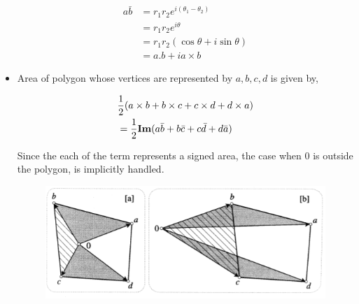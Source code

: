\documentclass[12pt]{article}
\def\mf{\ensuremath\mathbf}
\begin{document}
\begin{itemize}
    \begin{align*}
        a\bar{b} &= r_1r_2 e^{i(\theta_1-\theta_2)}\\
        &= r_1r_2e^{i\theta}\\
        &= r_1r_2(\cos\theta+i\sin\theta)\\
        &= a.b + ia\times b
    \end{align*}
    \item Area of polygon whose vertices are represented by $a,b,c,d$ is given by,

    \begin{align*}
        &\frac{1}{2}(a\times b + b\times c + c\times d + d\times a)\\
        &= \frac{1}{2}\mf{Im}(a\bar{b}+b\bar{c}+c\bar{d}+d\bar{a})
    \end{align*}

    Since the each of the term represents a signed area, the case when $0$ is outside the polygon, is implicitly handled.

    \begin{figure}[h!]
        \centering
        \includegraphics[scale=0.85]{fig_5}
        \label{f5}
    \end{figure}


\end{itemize}
\end{document}
